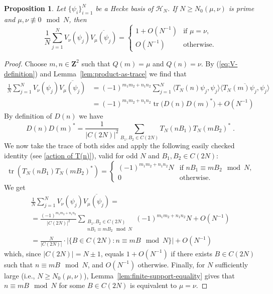 \documentclass[12pt]{amsart}
\newtheorem{prop}[thm]{Proposition}%
\theoremstyle{plain}
\newcommand{\Z}{{\mathbf Z}}
\newcommand{\trace}{\operatorname{tr}}
\newcommand{\T}{\TN}
\newcommand{\TN}{T_N}  %
\newcommand{\torusN}{C(2N)}%
\newcommand{\HN}{\mathcal H_N}
\renewcommand{\^}{\widehat}
\newcommand{\V}[1]{V_{#1}(\psi_j)}
\newcommand{\vnn}{\nu}
\newcommand{\vnm}{\mu}
\begin{document}
\begin{prop}
\label{prop:V-variance}
Let $\{\psi_i\}_{i=1}^N$ be a Hecke basis of $\HN$.  
If $N \geq N_0(\vnm,\vnn)$ is prime and 
$\vnm,\vnn \not \equiv 0 \mod N$,
then 
$$
\frac{1}{N}
\sum_{j=1}^N
\V{\vnn}
\overline{\V{\vnm}}
=
\begin{cases}
1+ O(N^{-1}) & \text{if $\vnm = \vnn$,}\\
O(N^{-1}) & \text{otherwise.}
\end{cases}
$$  
\end{prop}
\begin{proof} 
Choose  $m,n \in \Z^2$  such that $Q(m)=\vnm$ and $Q(n)=\vnn$.
By (\ref{eq:V-definition}) and Lemma~\ref{lem:product-as-trace} we
find that 
\begin{equation*}
\begin{split}
\frac{1}{N}
\sum_{j=1}^N
\V{\vnn}
\overline{\V{\vnm}}
& = 
(-1)^{m_1m_2+n_1n_2} 
\sum_{j=1}^N
\langle \T(n) \psi_j, \psi_j \rangle  
\overline{\langle \T(m) \psi_j, \psi_j \rangle  }\\
& =
(-1)^{m_1m_2+n_1n_2} 
\trace \big( D(n) D(m)^* \big)
+O(N^{-1})
\end{split}
\end{equation*}
By definition of $D(n)$ we have 
$$
D(n) D(m)^* =
\frac{1}{|\torusN|^2}
\sum_{B_1,B_2 \in \torusN}
\T(nB_1)\T(mB_2)^* \;.
$$
We now take the trace of both sides and apply the following easily
checked identity (see \eqref{action of T(n)}), valid for 
odd $N$ and $B_1,B_2 \in \torusN$: 
$$
\trace(\T(nB_1) \T(mB_2)^*  ) =
\begin{cases}
(-1)^{m_1m_2+n_1n_2}N & \text{if $nB_1 \equiv mB_2 \mod N$,} \\
0 & \text{otherwise.}
\end{cases} 
$$
We get
\begin{multline}\label{ident-2}
\frac{1}{N}
\sum_{j=1}^N
\V{\vnn}
\overline{\V{\vnm}}
= \\
=
\frac{(-1)^{m_1 m_2+n_1n_2} }{|\torusN|^2}
\sum_{\substack{B_1,B_2 \in \torusN \\ nB_1 \equiv mB_2 \mod N}}
(-1)^{m_1 m_2+n_1n_2}N
+O(N^{-1}) \\
=
\frac{N }{|\torusN|} \cdot
|\{B \in \torusN : n \equiv mB \mod N\}|
+O(N^{-1})
\end{multline}
which, since $|\torusN| = N \pm 1$, equals
$1+ O(N^{-1})$ if there exists $B\in \torusN$ such that $ n
  \equiv mB \mod N$, and $O(N^{-1})$ otherwise.
Finally, for $N$ sufficiently large (i.e., $N \geq N_0(\vnm,\vnn)$),
Lemma~\ref{lem:finite-support-equality}
gives that $ n \equiv mB \mod N$ for some $B\in \torusN$ is equivalent
to $\vnm=\vnn$. 
\end{proof}
\end{document}
